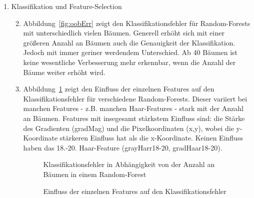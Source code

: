 \documentclass[]{report}
\newlength\figureheight
\newlength\figurewidth
\begin{document}
\begin{enumerate}
		\item Klassifikation und Feature-Selection
			\begin{enumerate}
				\setcounter{enumii}{1}
				\item Abbildung~\ref{fig:oobErr} zeigt den Klassifikationsfehler für Random-Forests mit unterschiedlich vielen Bäumen. Generell erhöht sich mit einer größeren Anzahl an Bäumen auch die Genauigkeit der Klassifikation. Jedoch mit immer geriner werdendem Unterschied. Ab 40 Bäumen ist keine wesentliche Verbesserung mehr erkennbar, wenn die Anzahl der Bäume weiter erhöht wird.
				\item Abbildung~\ref{fig:oobVar} zeigt den Einfluss der einzelnen Features auf den Klassifikationsfehler für verschiedene Random-Forests. Dieser variiert bei manchen Features - z.B. manchen Haar-Features - stark mit der Anzahl an Bäumen. Features mit insegesamt stärkstem Einfluss sind: die Stärke des Gradienten (gradMag) und die Pixelkoordinaten (x,y), wobei die y-Koordinate stärkeren Einfluss hat als die x-Koordinate. Keinen Einfluss haben das 18.-20. Haar-Feature (grayHarr18-20, gradHaar18-20).
			\setlength\figureheight{3.5cm}
			\setlength{}
				\begin{figure}
					\centering
					
					\caption{Klassifikationsfehler in Abhängigkeit von der Anzahl an Bäumen in einem Random-Forest}
					\label{fig:oobErr}
					\caption{Einfluss der einzelnen Features auf den Klassifikationsfehler}
					\label{fig:oobVar}
				\end{figure}
			\end{enumerate}
		

\end{enumerate}
\end{document}
